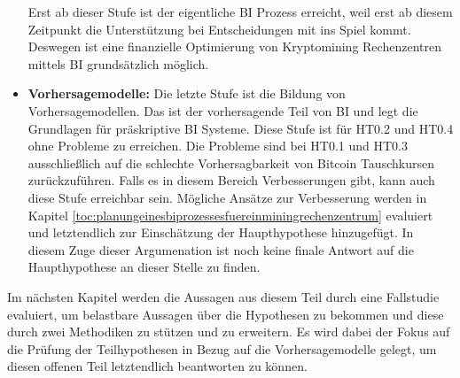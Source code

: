 \begin{itemize}
    Erst ab dieser Stufe ist der eigentliche \ac{BI} Prozess erreicht, weil erst ab diesem Zeitpunkt die Unterstützung
    bei Entscheidungen mit ins Spiel kommt. Deswegen ist eine finanzielle Optimierung von Kryptomining Rechenzentren mittels
    \ac{BI} grundsätzlich möglich.
    \item \textbf{Vorhersagemodelle: }Die letzte Stufe ist die Bildung von Vorhersagemodellen. Das ist der vorhersagende Teil von
    \ac{BI} und legt die Grundlagen für präskriptive \ac{BI} Systeme. Diese Stufe ist für \ac{HT0.2} und \ac{HT0.4} ohne Probleme
    zu erreichen. Die Probleme sind bei \ac{HT0.1} und \ac{HT0.3} ausschließlich auf die schlechte Vorhersagbarkeit von Bitcoin
    Tauschkursen zurückzuführen. Falls es in diesem Bereich Verbesserungen gibt, kann auch diese Stufe erreichbar sein.
    Mögliche Ansätze zur Verbesserung werden in Kapitel \ref{toc:planungeinesbiprozessesfuereinminingrechenzentrum}
    evaluiert und letztendlich zur Einschätzung der Haupthypothese hinzugefügt. In diesem Zuge dieser Argumenation ist noch
    keine finale Antwort auf die Haupthypothese an dieser Stelle zu finden.
\end{itemize}

Im nächsten Kapitel werden die Aussagen aus diesem Teil durch eine Fallstudie evaluiert, um belastbare Aussagen über
die Hypothesen zu bekommen und diese durch zwei Methodiken zu stützen und zu erweitern. Es wird dabei der Fokus
auf die Prüfung der Teilhypothesen in Bezug auf die Vorhersagemodelle gelegt, um diesen offenen Teil
letztendlich beantworten zu können.
